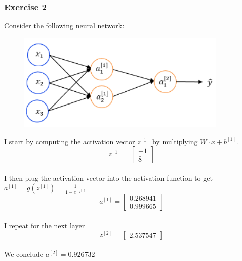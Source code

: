 \subsubsection*{Exercise 2}
Consider the following neural network:
\begin{figure}[htbp]
    \centering
    \includegraphics[width=10cm]{ExerciseBook/01-NeuralNetwork/exercise2.png}\newline
\end{figure}
I start by computing the activation vector $z^{[1]}$ by multiplying $W\cdot x+b^{[1]}$.
\[ 
    z^{[1]}=
    \begin{bmatrix}
        -1 \\
        8 
    \end{bmatrix}
\]
\\I then plug the activation vector into the activation function to get $a^{[1]} = g(z^{[1]}) = \frac{1}{1-e^{-z^{[1]}}}$
\[ 
    a^{[1]}=
    \begin{bmatrix}
        0.268941 \\
        0.999665
    \end{bmatrix}
\]\\I repeat for the next layer
\[ 
    z^{[2]}=
    \begin{bmatrix}
        2.537547
    \end{bmatrix}
\]
\\We conclude $a^{[2]}=0.926732$
